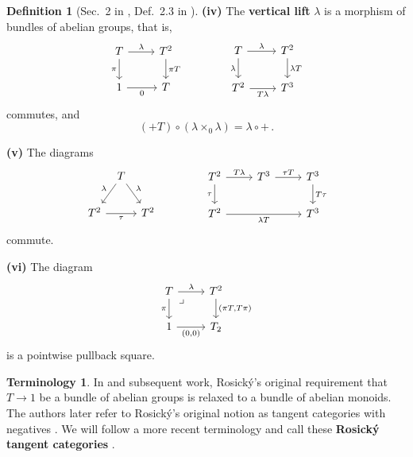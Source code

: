 \documentclass[12pt,reqno, a4paper]{amsart}
\numberwithin{equation}{section}
\theoremstyle{plain}
\theoremstyle{definition}
\newtheorem{Definition}[Theorem]{Definition}
\newtheorem{Terminology}[Theorem]{Terminology}
\theoremstyle{remark}
\newcommand{\Id}{\mathrm{1}}
\begin{document}
\begin{Definition}[Sec.~2 in \cite{Rosicky:1984}, Def.~2.3 in \cite{CockettCruttwell:2014}]
\textbf{(iv)} The \textbf{vertical lift} $\lambda$ is a morphism of bundles of abelian groups, that is,
\begin{equation}
\label{eq:TanFun3}
\begin{tikzcd}
T \ar[r, "\lambda"] \ar[d, "\pi"'] & T^2 \ar[d, "\pi T"]
\\
\Id \ar[r, "0"'] & T
\end{tikzcd}
\qquad\qquad
\begin{tikzcd}
T \ar[r, "\lambda"] \ar[d, "\lambda"'] &
T^2 \ar[d, "\lambda T"]
\\
T^2 \ar[r, "T \lambda"'] & T^3
\end{tikzcd}
\end{equation}
commutes, and
\begin{equation}
\label{eq:TanFun3add}
  (+T) \circ (\lambda \times_0 \lambda) = \lambda \circ +
  \,.
\end{equation}

\textbf{(v)} The diagrams
\begin{equation}
\label{eq:TanFun5}
\begin{tikzcd}[column sep=tiny]
& T \ar[dl, "\lambda"'] \ar[dr, "\lambda"] &
\\
T^2 \ar[rr, "\tau"'] & &
T^2
\end{tikzcd}
\qquad\qquad
\begin{tikzcd}
T^2 \ar[r, "T\lambda"] \ar[d, "\tau"'] &
T^3 \ar[r, "\tau T"] &
T^3 \ar[d, "T\tau"]
\\
T^2 \ar[rr, "\lambda T"'] & &
T^3
\end{tikzcd}
\end{equation}
commute.

\textbf{(vi)} The diagram
\begin{equation}
\label{eq:TanFun4}
\begin{tikzcd}
T \ar[r, "\lambda"] \ar[d, "\pi"']
\ar[dr, phantom, "\lrcorner", very near start]
& T^2 \ar[d, "{(\pi T, T\pi)}"]
\\
\Id \ar[r, "{(0, 0)}"'] & T_2
\end{tikzcd}
\end{equation}
is a pointwise pullback square.
\end{Definition}

\begin{Terminology}
\label{term:negatives}
In \cite{CockettCruttwell:2014} and subsequent work, Rosick\'{y}'s original requirement that $T \to \Id$ be a bundle of abelian groups is relaxed to a bundle of abelian monoids. The authors later refer to Rosick\'{y}'s original notion as tangent categories with negatives \cite{CockettCruttwell:2015,CockettCruttwellConnections:2017}. We will follow a more recent terminology and call these \textbf{Rosick\'y tangent categories} \cite{CruttwellLemay:2023,IkonicoffLanfranchiLemay:2023,LanfranchiLemay:2025}.
\end{Terminology}
\end{document}
